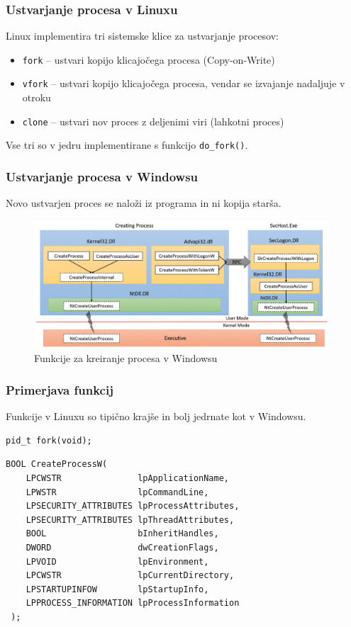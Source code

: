 \documentclass{beamer}
\begin{document}
\begin{frame}
	\frametitle{Ustvarjanje procesa v Linuxu}
	Linux implementira tri sistemske klice za ustvarjanje procesov:
	\begin{itemize}
		\item \texttt{fork} -- ustvari kopijo klicajočega procesa (Copy-on-Write)
		\item \texttt{vfork} -- ustvari kopijo klicajočega procesa, vendar se izvajanje nadaljuje v otroku
		\item \texttt{clone} -- ustvari nov proces z deljenimi viri (lahkotni proces) 
	\end{itemize}
																																																																		
	Vse tri so v jedru implementirane s funkcijo \texttt{do\_fork()}.
\end{frame}

\begin{frame}
	\frametitle{Ustvarjanje procesa v Windowsu}
	Novo ustvarjen proces se naloži iz programa in ni kopija starša.
	\begin{figure}
		\begin{center}
			\includegraphics[width=0.98\textwidth]{images/windows_createprocess_functions.png}
		\end{center}
		\caption{Funkcije za kreiranje procesa v Windowsu}
	\end{figure}
\end{frame}

\begin{frame}[fragile]
	\frametitle{Primerjava funkcij}
	Funkcije v Linuxu so tipično krajše in bolj jedrnate kot v Windowsu.
	\begin{lstlisting}[style=func]
 pid_t fork(void);
	\end{lstlisting}		
	\begin{lstlisting}[style=func]
 BOOL CreateProcessW(
	LPCWSTR               lpApplicationName,
	LPWSTR                lpCommandLine,
	LPSECURITY_ATTRIBUTES lpProcessAttributes,
	LPSECURITY_ATTRIBUTES lpThreadAttributes,
	BOOL                  bInheritHandles,
	DWORD                 dwCreationFlags,
	LPVOID                lpEnvironment,
	LPCWSTR               lpCurrentDirectory,
	LPSTARTUPINFOW        lpStartupInfo,
	LPPROCESS_INFORMATION lpProcessInformation
 );
	\end{lstlisting}
\end{frame}
\end{document}
